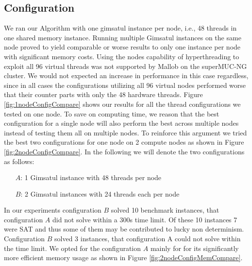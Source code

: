 \documentclass[12pt,a4paper,twoside]{scrartcl}
\numberwithin{equation}{section}
\begin{document}
\subsection{Configuration}
We ran our Algorithm with one gimsatul instance per node, i.e., 48 threads in one shared memory instance. Running multiple Gimsatul instances on the same node proved to yield comparable or worse results to only one instance per node with significant memory costs. Using the nodes capability of hyperthreading to exploit all 96 virtual threads was not supported by Mallob on the superMUC-NG cluster. We would not expected an increase in performance in this case regardless, since in all cases the configurations utilizing all 96 virtual nodes performed worse that their counter parts with only the 48 hardware threads. Figure \ref{fig:1nodeConfigCompare} shows our results for all the thread configurations we tested on one node. To save on computing time, we reason that the best configuration for a single node will also perform the best across multiple nodes instead of testing them all on multiple nodes. To reinforce this argument we tried the best two configurations for one node on 2 compute nodes as shown in Figure \ref{fig:2nodeConfigCompare}. In the following we will denote the two configurations as follows:
\begin{itemize}
  \item[$A$:] 1 Gimsatul instance with 48 threads per node
  \item[$B$:] 2 Gimsatul instances with 24 threads each per node
\end{itemize}
In our experiments configuration $B$ solved 10 benchmark instances, that configuration $A$ did not solve within a 300s time limit. Of these 10 instances 7 were SAT and thus some of them may be contributed to lucky non determinism. Configuration $B$ solved 3 instances, that configuration A could not solve within the time limit. We opted for the configuration $A$ mainly for for its significantly more efficient memory usage as shown in Figure \ref{fig:2nodeConfigMemCompare}.
\end{document}
